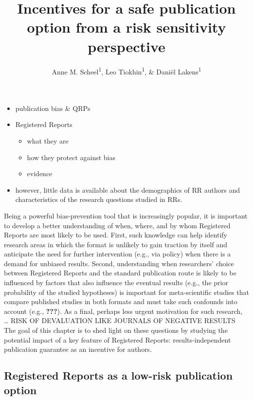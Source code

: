 \documentclass[british,,man,floatsintext]{apa6}
\title{Incentives for a safe publication option from a risk sensitivity perspective}
\author{Anne M. Scheel\textsuperscript{1}, Leo Tiokhin\textsuperscript{1}, \& Daniël Lakens\textsuperscript{1}}
\date{}
\affiliation{\vspace{0.5cm}\textsuperscript{1} Eindhoven University of Technology}
\providecommand{\tightlist}{%
  \setlength{\itemsep}{0pt}\setlength{\parskip}{0pt}}
\begin{document}
\maketitle

\begin{itemize}
\tightlist
\item
  publication bias \& QRPs
\item
  Registered Reports

  \begin{itemize}
  \tightlist
  \item
    what they are
  \item
    how they protect against bias
  \item
    evidence
  \end{itemize}
\item
  however, little data is available about the demographics of RR authors and characteristics of the research questions studied in RRs.
\end{itemize}

Being a powerful bias-prevention tool that is increasingly popular, it is important to develop a better understanding of when, where, and by whom Registered Reports are most likely to be used.
First, such knowledge can help identify research areas in which the format is unlikely to gain traction by itself and anticipate the need for further intervention (e.g., via policy) when there is a demand for unbiased results.
Second, understanding when researchers' choice between Registered Reports and the standard publication route is likely to be influenced by factors that also influence the eventual results (e.g., the prior probability of the studied hypotheses) is important for meta-scientific studies that compare published studies in both formats and must take such confounds into account (e.g., {\textbf{???}}).
As a final, perhaps less urgent motivation for such research, \ldots{} RISK OF DEVALUATION LIKE JOURNALS OF NEGATIVE RESULTS
The goal of this chapter is to shed light on these questions by studying the potential impact of a key feature of Registered Reports: results-independent publication guarantee as an incentive for authors.

\hypertarget{registered-reports-as-a-low-risk-publication-option}{%
\subsection{Registered Reports as a low-risk publication option}\label{registered-reports-as-a-low-risk-publication-option}}
\end{document}
